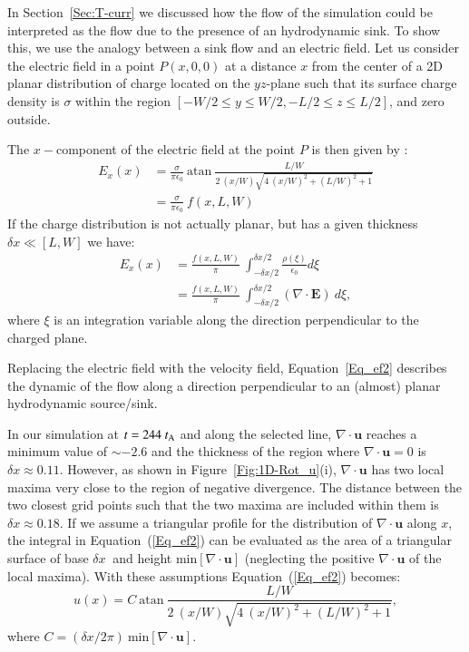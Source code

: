 \documentclass[apj]{emulateapj}
\newcommand{\tA}{t_{\rm A}}
\begin{document}
In Section~\ref{Sec:T-curr} we discussed how the flow of the simulation could be interpreted as the flow due to the presence of an hydrodynamic sink. To show this, we use the analogy between a sink flow and an electric field. Let us consider the electric field in a point $P(x,0,0)$ at a distance $x$ from the center of a 2D planar distribution of charge located on the $yz$-plane such that its surface charge density is $\sigma$ within the region $[ -W/2 \leq y \leq W/2, -L/2 \leq z \leq L/2]$, and zero outside. 

The $x-$component of the electric field at the point $P$ is then given by \citep{durand1964}: 
\begin{align}
 \nonumber E_{x}(x) &= \frac{\sigma}{\pi \epsilon_0}~\text{atan}~\frac{L/W}{2~(x/W) \sqrt{4~(x/W)^2+(L/W)^2+1}} \\
&= \frac{\sigma}{\pi \epsilon_0}~ f(x, L, W)
\end{align}
If the charge distribution is not actually planar, but has a given thickness $\delta x \ll [L,W]$ we have:
\begin{align}
\nonumber E_{x}(x)&= \frac{f(x, L, W)}{\pi}~\int_{-\delta x/2}^{\delta x/2} \frac{\rho(\xi) }{\epsilon_0} d\xi \\
&= \frac{f(x, L, W)}{\pi}~\int_{-\delta x/2}^{\delta x/2} (\nabla \cdot \mathbf{E})~ d \xi,
\label{Eq_ef2}
\end{align}
where $\xi$ is an integration variable along the direction perpendicular to the charged plane.

Replacing the electric field with the velocity field, Equation~\ref{Eq_ef2} describes the dynamic of the flow along a direction perpendicular to an (almost) planar hydrodynamic source/sink. 

In our simulation at $t=244~\tA$  and along the selected line, $\nabla \cdot \mathbf{u}$ reaches a minimum value of $\sim -2.6$ and the thickness of the region where $\nabla \cdot \mathbf{u}=0$ is $\delta x \approx 0.11$. However, as shown in Figure~\ref{Fig:1D-Rot_u}(i), $\nabla \cdot \mathbf{u}$ has two local maxima very close to the region of negative divergence.  The  distance between the two closest grid points  such that the two maxima are included within them  is  $ \delta x \approx 0.18$. If we assume a triangular profile for the distribution of $\nabla \cdot \mathbf{u}$ along $x$, the integral in Equation~(\ref{Eq_ef2}) can be evaluated as the area of a triangular surface of base $\delta x~$ and height min$[\nabla \cdot \mathbf{u}]$ (neglecting the positive $\nabla \cdot \mathbf{u}$ of the local maxima).  With these assumptions Equation~(\ref{Eq_ef2}) becomes: 
\begin{equation}
u(x) = C~\text{atan}~\frac{L/W}{2~(x/W) \sqrt{4~(x/W)^2+(L/W)^2+1}},
\label{Eq_ef4}
\end{equation}
where $C= ( \delta x/2\pi)~\text{min}[\nabla \cdot \mathbf{u}]$. 
\end{document}
